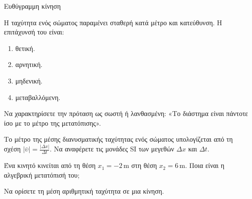 \begin{Assessment}[student=true,date=true,duration={90 λεπτά}]{Ευθύγραμμη κίνηση}
\begin{AssessmentQuestion}[5]\label{asq:KRI1-A1}
Η ταχύτητα ενός σώματος παραμένει σταθερή κατά μέτρο και κατεύθυνση.
Η επιτάχυνσή του είναι:
\begin{enumerate}[label=\BookGreek*. ,leftmargin=7mm,itemsep=1pt]
\item θετική. \item αρνητική. \item μηδενική. \item μεταβαλλόμενη.
\end{enumerate}
\end{AssessmentQuestion}
\begin{AssessmentQuestion}[5]
Να χαρακτηρίσετε την πρόταση ως σωστή ή λανθασμένη:
«Το διάστημα είναι πάντοτε ίσο με το μέτρο της μετατόπισης».
\TrueFalseChoices
\end{AssessmentQuestion}
\begin{AssessmentQuestion}[5]
Το μέτρο της μέσης διανυσματικής ταχύτητας ενός σώματος
υπολογίζεται από τη σχέση $|\bar{\upsilon}|=\frac{|\Delta x|}{\Delta t}$.
Να αναφέρετε τις μονάδες SI των μεγεθών $\Delta x$ και $\Delta t$.
\end{AssessmentQuestion}
\begin{AssessmentQuestion}[5]
Ένα κινητό κινείται από τη θέση $x_1=-2\,\mathrm{m}$ στη θέση
$x_2=6\,\mathrm{m}$. Ποια είναι η αλγεβρική μετατόπισή του;
\end{AssessmentQuestion}
\begin{AssessmentQuestion}[5]
Να ορίσετε τη μέση αριθμητική ταχύτητα σε μια κίνηση.
\end{AssessmentQuestion}


\end{Assessment}
